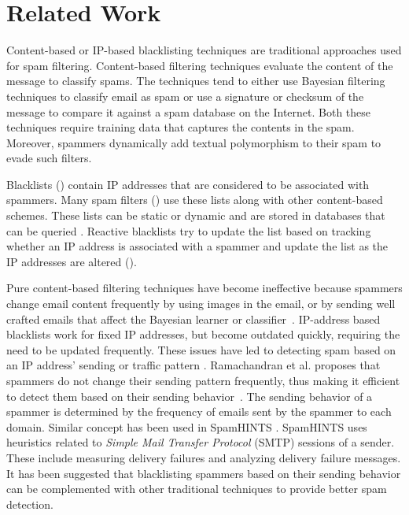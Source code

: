 \section{Related Work}
\label{related}
Content-based or IP-based blacklisting techniques are traditional approaches used for spam filtering. Content-based filtering techniques evaluate the content of the message to classify spams. The techniques tend to either use Bayesian filtering techniques to classify email as spam \cite{bayesian,spambayes,sahami98bayesian} or use a signature or checksum \cite{dcc} of the message to compare it against a spam database on the Internet. Both these techniques require training data that captures the contents in the spam. Moreover, spammers dynamically add textual polymorphism to their spam to evade such filters.

Blacklists (\cite{spamhaus,spamcop,uribl,dnsbl}) contain IP addresses that are considered to be associated with spammers. Many spam filters (\cite{spamassassin,mailavenger}) use these lists along with other content-based schemes. These lists can be static or dynamic and are stored in databases that can be queried \cite{dnsbl}. Reactive blacklists try to update the list based on tracking whether an IP address is associated with a spammer and update the list as the IP addresses are altered (\cite{spamhaus,spamcop,uribl}).

Pure content-based filtering techniques have become ineffective because spammers change email content frequently by using images in the email, or by sending well crafted emails that affect the Bayesian learner or classifier~\cite{wittel-wu-2004-attacking, nelson-etal-2008-spambayes}. IP-address based blacklists work for fixed IP addresses, but become outdated quickly, requiring the need to be updated frequently. These issues have led to detecting spam based on an IP address' sending or traffic pattern \cite{bb,Spamhints}. Ramachandran et al. proposes that spammers do not change their sending pattern frequently, thus making it efficient to detect them based on their sending behavior~\cite{bb}. The sending behavior of a spammer is determined by the frequency of emails sent by the spammer to each domain. Similar concept has been used in SpamHINTS \cite{Spamhints,clayton04stopping,DBLP:conf/ceas/Clayton05}. SpamHINTS uses heuristics related to \emph{Simple Mail Transfer Protocol} (SMTP) sessions of a sender. These include measuring delivery failures and analyzing delivery failure messages. It has been suggested that blacklisting spammers based on their sending behavior can be complemented with other traditional techniques to provide better spam detection.

